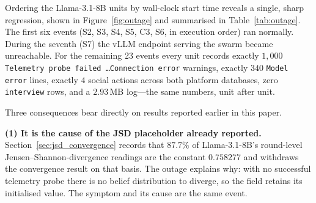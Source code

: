 \documentclass[11pt,journal,onecolumn]{IEEEtran}
\begin{document}
Ordering the Llama-3.1-8B units by wall-clock start time reveals a single, sharp regression, shown in Figure~\ref{fig:outage} and summarised in Table~\ref{tab:outage}. The first six events (S2, S3, S4, S5, C3, S6, in execution order) ran normally. During the seventh (S7) the vLLM endpoint serving the swarm became unreachable. For the remaining 23 events every unit records exactly $1{,}000$ \texttt{Telemetry probe failed \ldots Connection error} warnings, exactly $340$ \texttt{Model error} lines, exactly $4$ social actions across both platform databases, zero \texttt{interview} rows, and a $2.93$\,MB log---the same numbers, unit after unit.

\begin{table}[!htbp]
\centering
\caption{Llama-3.1-8B campaign, per-unit run health by execution phase. Social actions and \texttt{interview} rows are counted from the authoritative SQLite \texttt{trace} tables; failure counts from \texttt{simulation.log}. The \texttt{interview} action is the telemetry probe that extracts each agent's belief state, i.e.\ the channel the Condition B and C forecasts are read from.}
\label{tab:outage}
\footnotesize
\setlength{\tabcolsep}{4pt}
\setlength{\tabcolsep}{6pt}
\end{table}

Three consequences bear directly on results reported earlier in this paper.

\textbf{(1) It is the cause of the JSD placeholder already reported.} Section~\ref{sec:jsd_convergence} records that $87.7\%$ of Llama-3.1-8B's round-level Jensen--Shannon-divergence readings are the constant $0.758277$ and withdraws the convergence result on that basis. The outage explains why: with no successful telemetry probe there is no belief distribution to diverge, so the field retains its initialised value. The symptom and its cause are the same event.
\end{document}
